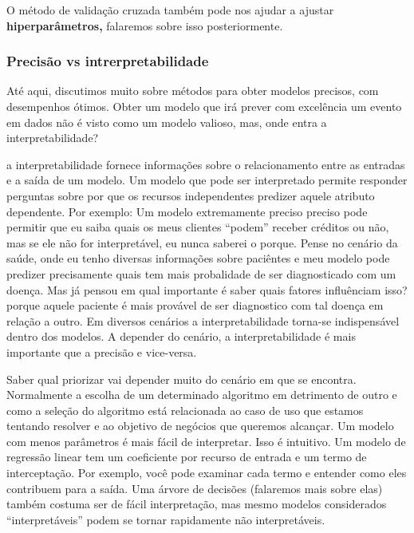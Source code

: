 \documentclass[
  letterpaper,
  DIV=11,
  numbers=noendperiod]{scrreprt}
\begin{document}
O método de validação cruzada também pode nos ajudar a ajustar
\textbf{hiperparâmetros,} falaremos sobre isso posteriormente.

\hypertarget{precisuxe3o-vs-intrerpretabilidade}{%
\subsubsection{Precisão vs
intrerpretabilidade}\label{precisuxe3o-vs-intrerpretabilidade}}

Até aqui, discutimos muito sobre métodos para obter modelos precisos,
com desempenhos ótimos. Obter um modelo que irá prever com excelência um
evento em dados não é visto como um modelo valioso, mas, onde entra a
interpretabilidade?

a interpretabilidade fornece informações sobre o relacionamento entre as
entradas e a saída de um modelo. Um modelo que pode ser interpretado
permite responder perguntas sobre por que os recursos independentes
predizer aquele atributo dependente. Por exemplo: Um modelo extremamente
preciso preciso pode permitir que eu saiba quais os meus clientes
``podem'' receber créditos ou não, mas se ele não for interpretável, eu
nunca saberei o porque. Pense no cenário da saúde, onde eu tenho
diversas informações sobre paciêntes e meu modelo pode predizer
precisamente quais tem mais probalidade de ser diagnosticado com um
doença. Mas já pensou em qual importante é saber quais fatores
influênciam isso? porque aquele paciente é mais provável de ser
diagnostico com tal doença em relação a outro. Em diversos cenários a
interpretabilidade torna-se indispensável dentro dos modelos. A depender
do cenário, a interpretabilidade é mais importante que a precisão e
vice-versa.

Saber qual priorizar vai depender muito do cenário em que se encontra.
Normalmente a escolha de um determinado algoritmo em detrimento de outro
e como a seleção do algoritmo está relacionada ao caso de uso que
estamos tentando resolver e ao objetivo de negócios que queremos
alcançar. Um modelo com menos parâmetros é mais fácil de interpretar.
Isso é intuitivo. Um modelo de regressão linear tem um coeficiente por
recurso de entrada e um termo de interceptação. Por exemplo, você pode
examinar cada termo e entender como eles contribuem para a saída. Uma
árvore de decisões (falaremos mais sobre elas) também costuma ser de
fácil interpretação, mas mesmo modelos considerados ``interpretáveis''
podem se tornar rapidamente não interpretáveis.

\end{document}
